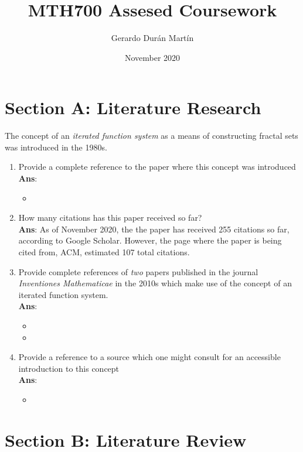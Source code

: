 \documentclass[11pt]{article}
\title{MTH700 Assesed Coursework}
\author{Gerardo Durán Martín}
\date{November 2020}
\begin{document}
\maketitle

\section*{Section A: Literature Research}
The concept of an \textit{iterated function system} as a means of constructing fractal sets was introduced in the 1980s.
\begin{enumerate}[label=(\alph*)]
	\item Provide a complete reference to the paper where this concept was introduced \\ \textbf{Ans}:
	\begin{itemize}
	\item {}
	\end{itemize}
	\item How many citations has this paper received so far? \\ \textbf{Ans}: As of November 2020, the the paper has received 255 citations so far, according to Google Scholar. However, the page where the paper is being cited from, ACM, estimated 107 total citations. 
	\item Provide complete references of \textit{two} papers published in the journal \textit{Inventiones Mathematicae} in the 2010s which make use of the concept of an iterated function system. \\ \textbf{Ans}:
	\begin{itemize}
		\item {}
		\item {}
	\end{itemize}
	\item Provide a reference to a source which one might consult for an accessible introduction to this concept \\ \textbf{Ans}:
	\begin{itemize}
		\item {}
	\end{itemize}
\end{enumerate}

\section*{Section B: Literature Review}
\end{document}
